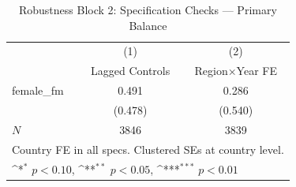 \begin{table}[htbp]\centering
\def\sym#1{\ifmmode^{#1}\else\(^{#1}\)\fi}
\caption{Robustness Block 2: Specification Checks — Primary Balance}
\begin{tabular}{l*{2}{c}}
\hline\hline
            &\multicolumn{1}{c}{(1)}&\multicolumn{1}{c}{(2)}\\
            &\multicolumn{1}{c}{Lagged Controls}&\multicolumn{1}{c}{Region×Year FE}\\
\hline
female\_fm   &       0.491         &       0.286         \\
            &     (0.478)         &     (0.540)         \\
\hline
\(N\)       &        3846         &        3839         \\
\hline\hline
\multicolumn{3}{l}{\footnotesize Country FE in all specs. Clustered SEs at country level.}\\
\multicolumn{3}{l}{\footnotesize \sym{*} \(p<0.10\), \sym{**} \(p<0.05\), \sym{***} \(p<0.01\)}\\
\end{tabular}
\end{table}
